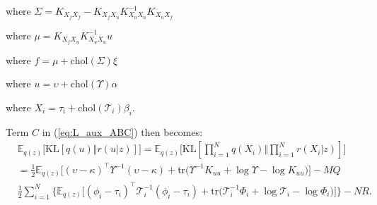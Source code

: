 \documentclass[12pt]{article}
\newcommand{\Tau}{\mathcal{T}}
\newcommand{\Kff}{K_{X_fX_f}}
\newcommand{\Kuu}{K_{X_uX_u}}
\newcommand{\Kuf}{K_{X_uX_f}}
\newcommand{\Kfu}{K_{X_fX_u}}
\newcommand{\chol}{\mathrm{chol}}
\begin{document}
where $\Sigma = \Kff - \Kfu\Kuu^{-1}\Kuf$

where $\mu   = \Kfu\Kuu^{-1}u$

where $f = \mu + \chol(\Sigma)\xi $

where $u = \upsilon + \chol(\Upsilon)\alpha$

where $X_i = \tau_i + \chol(\Tau_i)\beta_i$.

Term $C$ in (\ref{eq:L_aux_ABC}) then becomes:
%
\begin{align}
    &\mathbb{E}_{q(z)}\big[ \text{KL}[q(u)\Vert r(u|z)] \big] = \mathbb{E}_{q(z)}\big[ \text{KL}[\prod_{i=1}^Nq(X_i)\Vert \prod_{i=1}^Nr(X_i|z)] \big]\\
    &= \frac{1}{2}\mathbb{E}_{q(z)}\big[ (\upsilon - \kappa)^\top\Upsilon^{-1}(\upsilon - \kappa) + \text{tr}\big( \Upsilon^{-1}K_{uu} + \log\Upsilon - \log K_{uu} \big) \big] - MQ\\
    &\frac{1}{2}\sum_{i=1}^N \big\{ \mathbb{E}_{q(z)}\big[ (\phi_i - \tau_i)^\top\Tau_i^{-1}(\phi_i - \tau_i) + \text{tr}\big( \Tau_i^{-1}\Phi_i + \log\Tau_i - \log\Phi_i \big) \big] \big\} - NR.
\end{align}
\end{document}
